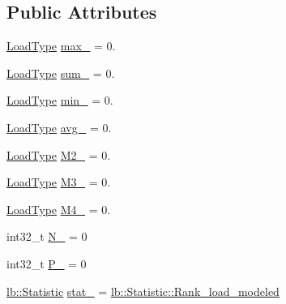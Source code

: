 \subsection*{Public Attributes}
\begin{DoxyCompactItemize}
\item 
\hyperlink{namespacevt_a8fb51741340b87d7aaee0bef60e9896b}{Load\+Type} \hyperlink{structvt_1_1vrt_1_1collection_1_1balance_1_1_load_data_a31dc4202e3996b256d758c99814faf82}{max\+\_\+} = 0.
\item 
\hyperlink{namespacevt_a8fb51741340b87d7aaee0bef60e9896b}{Load\+Type} \hyperlink{structvt_1_1vrt_1_1collection_1_1balance_1_1_load_data_a3f32c0fbcce57bb133a1fcb51b996877}{sum\+\_\+} = 0.
\item 
\hyperlink{namespacevt_a8fb51741340b87d7aaee0bef60e9896b}{Load\+Type} \hyperlink{structvt_1_1vrt_1_1collection_1_1balance_1_1_load_data_a2c9c7c76d1d542f712512856aebce7e2}{min\+\_\+} = 0.
\item 
\hyperlink{namespacevt_a8fb51741340b87d7aaee0bef60e9896b}{Load\+Type} \hyperlink{structvt_1_1vrt_1_1collection_1_1balance_1_1_load_data_a41b692659f1d1a3ece97effed0df63ce}{avg\+\_\+} = 0.
\item 
\hyperlink{namespacevt_a8fb51741340b87d7aaee0bef60e9896b}{Load\+Type} \hyperlink{structvt_1_1vrt_1_1collection_1_1balance_1_1_load_data_ad869c12e4058ce2d8fbf98514d12a61b}{M2\+\_\+} = 0.
\item 
\hyperlink{namespacevt_a8fb51741340b87d7aaee0bef60e9896b}{Load\+Type} \hyperlink{structvt_1_1vrt_1_1collection_1_1balance_1_1_load_data_a338d9f37b341df56e3da48b4402fec15}{M3\+\_\+} = 0.
\item 
\hyperlink{namespacevt_a8fb51741340b87d7aaee0bef60e9896b}{Load\+Type} \hyperlink{structvt_1_1vrt_1_1collection_1_1balance_1_1_load_data_a35f1b2bfde4bb768eb9c7346d9daa78c}{M4\+\_\+} = 0.
\item 
int32\+\_\+t \hyperlink{structvt_1_1vrt_1_1collection_1_1balance_1_1_load_data_a5e1f990aaaad4bfe9bf9f0a8dc4efecc}{N\+\_\+} = 0
\item 
int32\+\_\+t \hyperlink{structvt_1_1vrt_1_1collection_1_1balance_1_1_load_data_a6f221924e77d7c24d97cd41da5ff274c}{P\+\_\+} = 0
\item 
\hyperlink{namespacevt_1_1vrt_1_1collection_1_1lb_af0e20ef9afee77295053aa83bf1348b1}{lb\+::\+Statistic} \hyperlink{structvt_1_1vrt_1_1collection_1_1balance_1_1_load_data_a59f6d4e2b150a9e5fe32a375b4a6603d}{stat\+\_\+} = \hyperlink{namespacevt_1_1vrt_1_1collection_1_1lb_af0e20ef9afee77295053aa83bf1348b1aa91c95683ba4869756e2b2cb4483fd53}{lb\+::\+Statistic\+::\+Rank\+\_\+load\+\_\+modeled}
\end{DoxyCompactItemize}
